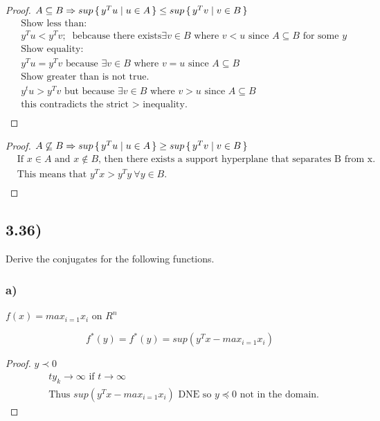 \documentclass[12pt]{article}
\begin{document}
\begin{proof}{$A \subseteq B \Rightarrow sup\set{y^Tu | u \in A} \le sup\set{y^Tv | v \in B}$}
\begin{align*}
& \text{Show less than:}\\
& y^Tu < y^Tv;\ \text{ bebcause there exists$\exists v \in B$ where $v < u$ since $A \subseteq B$ for some $y$}\\
&\text{Show equality:}\\
& y^Tu = y^Tv \text{ because $\exists v \in B$ where $v = u$ since $A \subseteq B$}\\
&\text{Show greater than is not true.}\\
& y^tu > y^Tv \text{ but because $\exists v \in B$ where $v > u$ since $A \subseteq B$}\\
& \text{this contradicts the strict $>$ inequality.}\\
\end{align*}
\end{proof}

\begin{proof}{$A \not\subseteq B \Rightarrow sup\set{y^Tu | u \in A} \ge sup\set{y^Tv | v \in B}$}
\begin{align*}
&  \text{If $x \in A$ and $x \not\in B$, then there exists a support hyperplane that separates B from x.}\\
& \text{This means that $y^Tx > y^Ty\ \forall y \in B$.}\\
\end{align*}
\end{proof}

\subsection*{3.36)}
Derive the conjugates for the following functions.

\subsubsection*{a)}
$f(x) = max_{i=1}x_i$ on $R^n$

$$f^*(y) = f^*(y) = sup(y^Tx - max_{i=1}x_i)$$
\begin{proof}{$y \prec 0$}
\begin{align*}
& ty_k \rightarrow \infty \text{ if } t \rightarrow \infty\\
& \text{Thus } sup(y^Tx - max_{i=1}x_i) \text{ DNE so $y \preceq 0$ not in the domain.}
\end{align*}
\end{proof}
\end{document}
